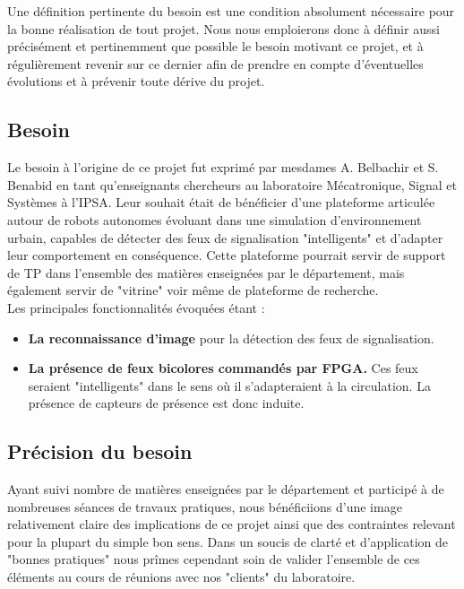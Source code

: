 Une définition pertinente du besoin est une condition absolument nécessaire pour la bonne réalisation de tout projet. Nous nous emploierons donc à définir aussi précisément et pertinemment que possible le besoin motivant ce projet, et à régulièrement revenir sur ce dernier afin de prendre en compte d'éventuelles évolutions et à prévenir toute dérive du projet.

\subsection{Besoin}
Le besoin à l'origine de ce projet fut exprimé par mesdames A. Belbachir et S. Benabid en tant qu'enseignants chercheurs au laboratoire Mécatronique, Signal et Systèmes à l'IPSA. Leur souhait était de bénéficier d'une plateforme articulée autour de robots autonomes évoluant dans une simulation d’environnement urbain, capables de détecter des feux de signalisation "intelligents" et d'adapter leur comportement en conséquence. Cette plateforme pourrait servir de support de TP dans l'ensemble des matières enseignées par le département, mais également servir de "vitrine" voir même de plateforme de recherche.\\

Les principales fonctionnalités évoquées étant :
\begin{itemize}
	\item \textbf{La reconnaissance d'image} pour la détection des feux de signalisation.
	\item \textbf{La présence de feux bicolores commandés par FPGA.} Ces feux seraient "intelligents" dans le sens où il s'adapteraient à la circulation. La présence de capteurs de présence est donc induite.
\end{itemize}

\subsection{Précision du besoin}

Ayant suivi nombre de matières enseignées par le département et participé à de nombreuses séances de travaux pratiques, nous bénéficiions d'une image relativement claire des implications de ce projet ainsi que des contraintes relevant pour la plupart du simple bon sens.
Dans un soucis de clarté et d'application de "bonnes pratiques" nous prîmes cependant soin de valider l'ensemble de ces éléments au cours de réunions avec nos "clients" du laboratoire.\\

